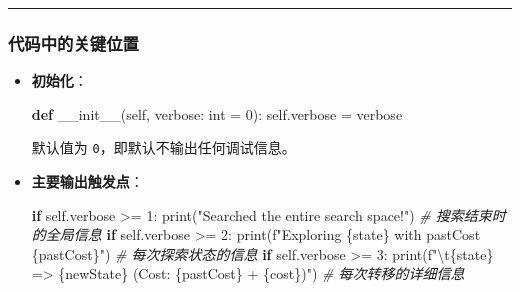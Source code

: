 \documentclass[
]{article}
\newenvironment{Shaded}{}{}
\newcommand{\BuiltInTok}[1]{\textcolor[rgb]{0.00,0.50,0.00}{#1}}
\newcommand{\CharTok}[1]{\textcolor[rgb]{0.25,0.44,0.63}{#1}}
\newcommand{\CommentTok}[1]{\textcolor[rgb]{0.38,0.63,0.69}{\textit{#1}}}
\newcommand{\ControlFlowTok}[1]{\textcolor[rgb]{0.00,0.44,0.13}{\textbf{#1}}}
\newcommand{\DecValTok}[1]{\textcolor[rgb]{0.25,0.63,0.44}{#1}}
\newcommand{\FunctionTok}[1]{\textcolor[rgb]{0.02,0.16,0.49}{#1}}
\newcommand{\KeywordTok}[1]{\textcolor[rgb]{0.00,0.44,0.13}{\textbf{#1}}}
\newcommand{\NormalTok}[1]{#1}
\newcommand{\OperatorTok}[1]{\textcolor[rgb]{0.40,0.40,0.40}{#1}}
\newcommand{\SpecialCharTok}[1]{\textcolor[rgb]{0.25,0.44,0.63}{#1}}
\newcommand{\SpecialStringTok}[1]{\textcolor[rgb]{0.73,0.40,0.53}{#1}}
\newcommand{\StringTok}[1]{\textcolor[rgb]{0.25,0.44,0.63}{#1}}
\newcommand{\VariableTok}[1]{\textcolor[rgb]{0.10,0.09,0.49}{#1}}
\begin{document}
\begin{center}\rule{0.5\linewidth}{0.5pt}\end{center}

\subsubsection{\texorpdfstring{\textbf{代码中的关键位置}}{代码中的关键位置}}\label{header-n31}

\begin{itemize}
\item
  \textbf{初始化}：

\begin{Shaded}
\begin{Highlighting}[]
\KeywordTok{def} \FunctionTok{\_\_init\_\_}\NormalTok{(}\VariableTok{self}\NormalTok{, verbose: }\BuiltInTok{int} \OperatorTok{=} \DecValTok{0}\NormalTok{):}
    \VariableTok{self}\NormalTok{.verbose }\OperatorTok{=}\NormalTok{ verbose}
\end{Highlighting}
\end{Shaded}

  默认值为 \texttt{0}，即默认不输出任何调试信息。
\item
  \textbf{主要输出触发点}：

\begin{Shaded}
\begin{Highlighting}[]
\ControlFlowTok{if} \VariableTok{self}\NormalTok{.verbose }\OperatorTok{\textgreater{}=} \DecValTok{1}\NormalTok{:}
    \BuiltInTok{print}\NormalTok{(}\StringTok{"Searched the entire search space!"}\NormalTok{)  }\CommentTok{\# 搜索结束时的全局信息}
\ControlFlowTok{if} \VariableTok{self}\NormalTok{.verbose }\OperatorTok{\textgreater{}=} \DecValTok{2}\NormalTok{:}
    \BuiltInTok{print}\NormalTok{(}\SpecialStringTok{f"Exploring }\SpecialCharTok{\{}\NormalTok{state}\SpecialCharTok{\}}\SpecialStringTok{ with pastCost }\SpecialCharTok{\{}\NormalTok{pastCost}\SpecialCharTok{\}}\SpecialStringTok{"}\NormalTok{)  }\CommentTok{\# 每次探索状态的信息}
\ControlFlowTok{if} \VariableTok{self}\NormalTok{.verbose }\OperatorTok{\textgreater{}=} \DecValTok{3}\NormalTok{:}
    \BuiltInTok{print}\NormalTok{(}\SpecialStringTok{f"}\CharTok{\textbackslash{}t}\SpecialCharTok{\{}\NormalTok{state}\SpecialCharTok{\}}\SpecialStringTok{ =\textgreater{} }\SpecialCharTok{\{}\NormalTok{newState}\SpecialCharTok{\}}\SpecialStringTok{ (Cost: }\SpecialCharTok{\{}\NormalTok{pastCost}\SpecialCharTok{\}}\SpecialStringTok{ + }\SpecialCharTok{\{}\NormalTok{cost}\SpecialCharTok{\}}\SpecialStringTok{)"}\NormalTok{)  }\CommentTok{\# 每次转移的详细信息}
\end{Highlighting}
\end{Shaded}
\end{itemize}
\end{document}
